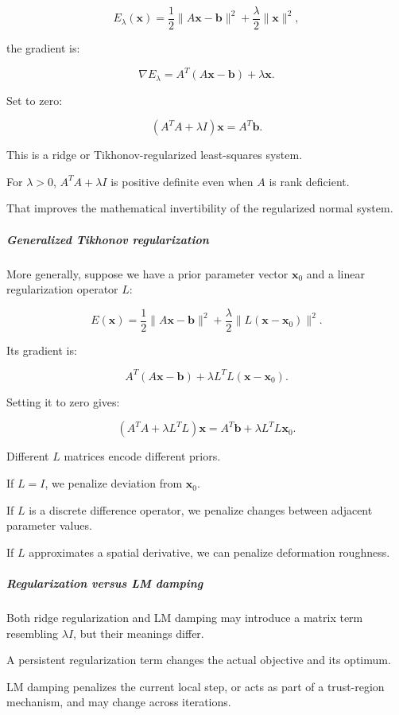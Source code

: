 \[
E_\lambda(\mathbf x) = \frac12\|A\mathbf x-\mathbf b\|^2 +\frac\lambda2\|\mathbf x\|^2,
\]

the gradient is:

\[
\nabla E_\lambda = A^T(A\mathbf x-\mathbf b)+\lambda\mathbf x.
\]

Set to zero:

\[
\boxed{ (A^TA+\lambda I)\mathbf x=A^T\mathbf b }.
\]

This is a ridge or Tikhonov-regularized least-squares system.

For \(\lambda>0\), \(A^TA+\lambda I\) is positive definite even when \(A\) is rank deficient.

That improves the mathematical invertibility of the regularized normal system.

\subparagraph{Generalized Tikhonov regularization}\label{generalized-tikhonov-regularization}

More generally, suppose we have a prior parameter vector \(\mathbf x_0\) and a linear regularization operator \(L\):

\[
E(\mathbf x)= \frac12\|A\mathbf x-\mathbf b\|^2+ \frac\lambda2\|L(\mathbf x-\mathbf x_0)\|^2.
\]

Its gradient is:

\[
A^T(A\mathbf x-\mathbf b)+ \lambda L^TL(\mathbf x-\mathbf x_0).
\]

Setting it to zero gives:

\[
\boxed{ (A^TA+\lambda L^TL)\mathbf x = A^T\mathbf b+\lambda L^TL\mathbf x_0 }.
\]

Different \(L\) matrices encode different priors.

If \(L=I\), we penalize deviation from \(\mathbf x_0\).

If \(L\) is a discrete difference operator, we penalize changes between adjacent parameter values.

If \(L\) approximates a spatial derivative, we can penalize deformation roughness.

\subparagraph{Regularization versus LM damping}\label{regularization-versus-lm-damping}

Both ridge regularization and LM damping may introduce a matrix term resembling \(\lambda I\), but their meanings differ.

A persistent regularization term changes the actual objective and its optimum.

LM damping penalizes the current local step, or acts as part of a trust-region mechanism, and may change across iterations.

